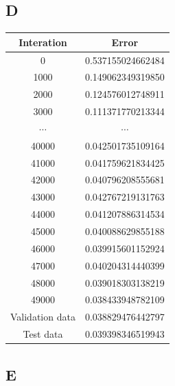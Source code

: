 \documentclass{article}
\begin{document}
        \subsection{D}
            \begin{tabular}{|c|c|}
                \hline
                Interation & Error \\
                \hline
                0 & 0.537155024662484 \\
                \hline
                1000 & 0.149062349319850 \\
                \hline
                2000 & 0.124576012748911 \\
                \hline
                3000 & 0.111371770213344 \\
                \hline
                $\cdots$ & $\cdots$\\
                \hline
                40000 & 0.042501735109164 \\
                \hline
                41000 & 0.041759621834425 \\
                \hline
                42000 & 0.040796208555681 \\
                \hline
                43000 & 0.042767219131763 \\
                \hline
                44000 & 0.041207886314534 \\
                \hline
                45000 & 0.040088629855188 \\
                \hline
                46000 & 0.039915601152924 \\
                \hline
                47000 & 0.040204314440399 \\
                \hline
                48000 & 0.039018303138219 \\
                \hline
                49000 & 0.038433948782109 \\
                \hline
                Validation data & 0.038829476442797\\
                \hline
                Test data & 0.039398346519943\\
                \hline
            \end{tabular}
        \subsection{E}
\end{document}
